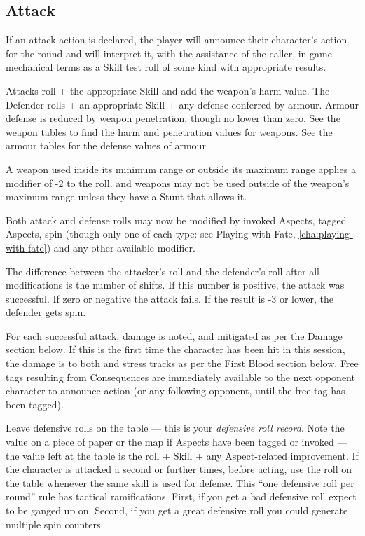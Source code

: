 
\subsection{Attack}\label{sec:personal-combat-attack}

If an attack action is declared, the player will announce their character's action for the round and will interpret it, with the assistance of the caller, in game mechanical terms as a Skill test roll of some kind with appropriate results.

Attacks roll \dF{} + the appropriate Skill and add the weapon's harm value. The Defender rolls \dF{} + an appropriate Skill + any defense conferred by armour. Armour defense is reduced by weapon penetration, though no lower than zero. See the weapon tables to find the harm and penetration values for weapons. See the armour tables for the defense values of armour.

A weapon used inside its minimum range or outside its maximum range applies a modifier of -2 to the roll.  and  weapons may not be used outside of the weapon's maximum range unless they have a Stunt that allows it.

Both attack and defense rolls may now be modified by invoked Aspects, tagged Aspects, spin (though only one of each type: see Playing with Fate, \autoref{cha:playing-with-fate}) and any other available modifier.

The difference between the attacker's roll and the defender's roll after all modifications is the number of shifts. If this number is positive, the attack was successful. If zero or negative the attack fails. If the result is -3 or lower, the defender gets spin.


For each successful attack, damage is noted, and mitigated as per the Damage section below. If this is the first time the character has been hit in this session, the damage is to both \Health{} and \Composure{} stress tracks as per the First Blood section below. Free tags resulting from Consequences are immediately available to the next opponent character to announce action (or any following opponent, until the free tag has been tagged).

Leave defensive rolls on the table --- this is your \emph{defensive roll record}. Note the value on a piece of paper or the map if Aspects have been tagged or invoked --- the value left at the table is the roll + Skill + any Aspect-related improvement. If the character is attacked a second or further times, before acting, use the roll on the table whenever the same skill is used for defense. This ``one defensive roll per round'' rule has tactical ramifications. First, if you get a bad defensive roll expect to be ganged up on. Second, if you get a great defensive roll you could generate multiple spin counters.

